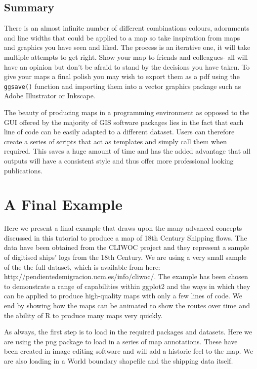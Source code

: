 \documentclass[]{article}
\begin{document}
\subsection{Summary}

There is an almost infinite number of different combinations colours,
adornments and line widths that could be applied to a map so take
inspiration from maps and graphics you have seen and liked. The process
is an iterative one, it will take multiple attempts to get right. Show
your map to friends and colleagues- all will have an opinion but don't
be afraid to stand by the decisions you have taken. To give your maps a
final polish you may wish to export them as a pdf using the
\texttt{ggsave()} function and importing them into a vector graphics
package such as Adobe Illustrator or Inkscape.

The beauty of producing maps in a programming environment as opposed to
the GUI offered by the majority of GIS software packages lies in the
fact that each line of code can be easily adapted to a different
dataset. Users can therefore create a series of scripts that act as
templates and simply call them when required. This saves a huge amount
of time and has the added advantage that all outputs will have a
consistent style and thus offer more professional looking publications.

\section{A Final Example}

Here we present a final example that draws upon the many advanced
concepts discussed in this tutorial to produce a map of 18th Century
Shipping flows. The data have been obtained from the CLIWOC project and
they represent a sample of digitised ships' logs from the 18th Century.
We are using a very small sample of the the full dataset, which is
available from here: http://pendientedemigracion.ucm.es/info/cliwoc/.
The example has been chosen to demonstrate a range of capabilities
within ggplot2 and the ways in which they can be applied to produce
high-quality maps with only a few lines of code. We end by showing how
the maps can be animated to show the routes over time and the ability of
R to produce many maps very quickly.

As always, the first step is to load in the required packages and
datasets. Here we are using the png package to load in a series of map
annotations. These have been created in image editing software and will
add a historic feel to the map. We are also loading in a World boundary
shapefile and the shipping data itself.
\end{document}
